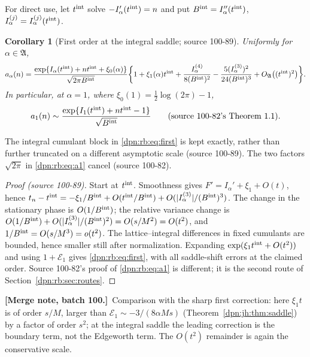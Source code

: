 \documentclass[11pt]{article}
\numberwithin{equation}{section}
\newtheorem{corollary}[theorem]{Corollary}
\theoremstyle{definition}\newtheorem{definition}[theorem]{Definition}
\theoremstyle{remark}\newtheorem{remark}[theorem]{Remark}
\newcommand{\src}[1]{\textup{(source #1)}}
\newcommand{\mergenoted}[1]{\par\smallskip\noindent\textbf{[Merge note, batch 100.]}\ #1\par\smallskip}
\begin{document}
For direct use, let $t^{\rm int}$ solve $-I_\alpha'(t^{\rm int})=n$ and put
$B^{\rm int}=I_\alpha''(t^{\rm int})$, $I^{(j)}_\alpha=I_\alpha^{(j)}(t^{\rm int})$.
\begin{corollary}[First order at the integral saddle; source 100-89]\label{dpn:rb:cor:first}
Uniformly for $\alpha\in\mathfrak A$,
\begin{equation}\label{dpn:rb:eq:first}
 a_\alpha(n)=\frac{\exp\{I_\alpha(t^{\rm int})+nt^{\rm int}+\xi_0(\alpha)\}}{\sqrt{2\pi B^{\rm int}}}
 \biggl\{1+\xi_1(\alpha)t^{\rm int}+\frac{I^{(4)}_\alpha}{8(B^{\rm int})^2}
 -\frac{5(I^{(3)}_\alpha)^2}{24(B^{\rm int})^3}+O_{\mathfrak A}\bigl((t^{\rm int})^2\bigr)\biggr\}.
\end{equation}
In particular, at $\alpha=1$, where $\xi_0(1)=\frac12\log(2\pi)-1$,
\begin{equation}\label{dpn:rb:eq:a1}
 a_1(n)\sim\frac{\exp\{I_1(t^{\rm int})+nt^{\rm int}-1\}}{\sqrt{B^{\rm int}}}
 \qquad\text{(source 100-82's Theorem~1.1)}.
\end{equation}
\end{corollary}
The integral cumulant block in \eqref{dpn:rb:eq:first} is kept exactly, rather
than further truncated on a different asymptotic scale \src{100-89}.  The two
factors $\sqrt{2\pi}$ in \eqref{dpn:rb:eq:a1} cancel \src{100-82}.
\begin{proof}[Proof \src{100-89}]
Start at $t^{\rm int}$.  Smoothness gives $F'=I_\alpha'+\xi_1+O(t)$, hence
$t_n-t^{\rm int}=-\xi_1/B^{\rm int}+O(t^{\rm int}/B^{\rm int})
+O(|I^{(3)}_\alpha|/(B^{\rm int})^3)$.  The change in the stationary phase is
$O(1/B^{\rm int})$; the relative variance change is
$O(1/B^{\rm int})+O(|I^{(3)}_\alpha|/(B^{\rm int})^2)=O(s/M^2)=O(t^2)$, and
$1/B^{\rm int}=O(s/M^3)=o(t^2)$.  The lattice--integral differences in fixed
cumulants are bounded, hence smaller still after normalization.  Expanding
$\exp(\xi_1t^{\rm int}+O(t^2))$ and using $1+\mathcal E_1$ gives
\eqref{dpn:rb:eq:first}, with all saddle-shift errors at the claimed order.
Source 100-82's proof of \eqref{dpn:rb:eq:a1} is different; it is the
second route of Section~\ref{dpn:rb:sec:routes}.
\end{proof}
\mergenoted{Comparison with the sharp first correction: here $\xi_1t$ is of
order $s/M$, larger than $\mathcal E_1\sim-3/(8\alpha Ms)$
(Theorem~\ref{dpn:jh:thm:saddle}) by a factor of order $s^2$; at the integral
saddle the leading correction is the boundary term, not the Edgeworth term.
The $O(t^2)$ remainder is again the conservative scale.}
\end{document}
